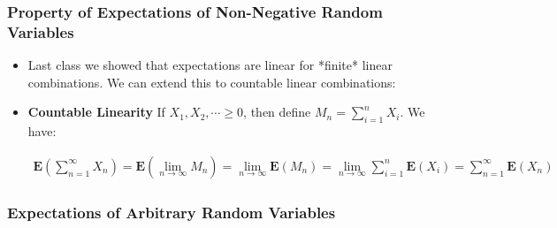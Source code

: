 \documentclass[handout]{beamer}
\newcommand{\BE}{\mathbf{E}}
\begin{document}
\frame
{
\frametitle{Property of Expectations of Non-Negative Random Variables }

\begin{itemize}

\item<1-> Last class we showed that expectations are linear for *finite* linear combinations. We can extend this to countable linear combinations:
                                                  
\item<1-> \textbf{Countable Linearity} If $X_1, X_2,\cdots \geq 0$, then define $M_n=\sum_{i=1}^n X_i$. We have:
                             
                             
                             
                              \begin{align*}\BE(\sum_{n=1}^{\infty} X_n )= \BE(\lim_{n\rightarrow \infty} M_n)  =\lim_{n\rightarrow \infty} \BE(M_n)= \lim_{n\rightarrow \infty} \sum_{i=1}^n \BE(X_i)=\sum_{n=1}^{\infty} \BE(X_n)\end{align*}
                              
                              
                                                  
                                 \end{itemize}
}



\subsubsection{Expectations of Arbitrary Random Variables}
\end{document}
